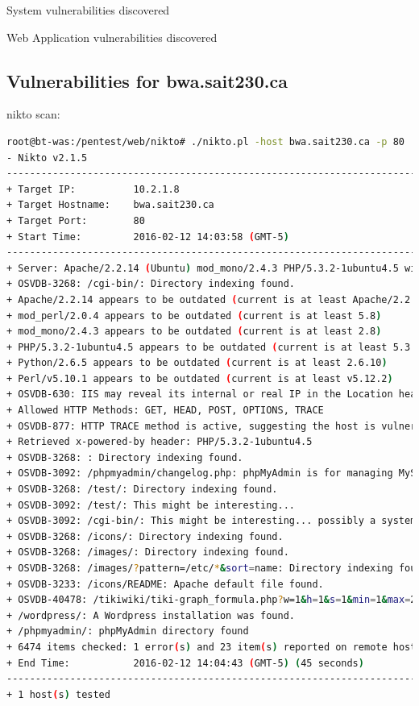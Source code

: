 \documentclass{article}
\begin{document}
System vulnerabilities discovered


Web Application vulnerabilities discovered


\subsection{Vulnerabilities for bwa.sait230.ca}

nikto scan:

\begin{lstlisting}[language=Bash]
root@bt-was:/pentest/web/nikto# ./nikto.pl -host bwa.sait230.ca -p 80
- Nikto v2.1.5
---------------------------------------------------------------------------
+ Target IP:          10.2.1.8
+ Target Hostname:    bwa.sait230.ca
+ Target Port:        80
+ Start Time:         2016-02-12 14:03:58 (GMT-5)
---------------------------------------------------------------------------
+ Server: Apache/2.2.14 (Ubuntu) mod_mono/2.4.3 PHP/5.3.2-1ubuntu4.5 with Suhosin-Patch mod_python/3.3.1 Python/2.6.5 mod_perl/2.0.4 Perl/v5.10.1
+ OSVDB-3268: /cgi-bin/: Directory indexing found.
+ Apache/2.2.14 appears to be outdated (current is at least Apache/2.2.19). Apache 1.3.42 (final release) and 2.0.64 are also current.
+ mod_perl/2.0.4 appears to be outdated (current is at least 5.8)
+ mod_mono/2.4.3 appears to be outdated (current is at least 2.8)
+ PHP/5.3.2-1ubuntu4.5 appears to be outdated (current is at least 5.3.6)
+ Python/2.6.5 appears to be outdated (current is at least 2.6.10)
+ Perl/v5.10.1 appears to be outdated (current is at least v5.12.2)
+ OSVDB-630: IIS may reveal its internal or real IP in the Location header via a request to the /images directory. The value is "http://127.0.0.1/images/".
+ Allowed HTTP Methods: GET, HEAD, POST, OPTIONS, TRACE 
+ OSVDB-877: HTTP TRACE method is active, suggesting the host is vulnerable to XST
+ Retrieved x-powered-by header: PHP/5.3.2-1ubuntu4.5
+ OSVDB-3268: : Directory indexing found.
+ OSVDB-3092: /phpmyadmin/changelog.php: phpMyAdmin is for managing MySQL databases, and should be protected or limited to authorized hosts.
+ OSVDB-3268: /test/: Directory indexing found.
+ OSVDB-3092: /test/: This might be interesting...
+ OSVDB-3092: /cgi-bin/: This might be interesting... possibly a system shell found.
+ OSVDB-3268: /icons/: Directory indexing found.
+ OSVDB-3268: /images/: Directory indexing found.
+ OSVDB-3268: /images/?pattern=/etc/*&sort=name: Directory indexing found.
+ OSVDB-3233: /icons/README: Apache default file found.
+ OSVDB-40478: /tikiwiki/tiki-graph_formula.php?w=1&h=1&s=1&min=1&max=2&f[]=x.tan.phpinfo()&t=png&title=http://cirt.net/rfiinc.txt?: TikiWiki contains a vulnerability which allows remote attackers to execute arbitrary PHP code.
+ /wordpress/: A Wordpress installation was found.
+ /phpmyadmin/: phpMyAdmin directory found
+ 6474 items checked: 1 error(s) and 23 item(s) reported on remote host
+ End Time:           2016-02-12 14:04:43 (GMT-5) (45 seconds)
---------------------------------------------------------------------------
+ 1 host(s) tested
\end{lstlisting}
\end{document}
